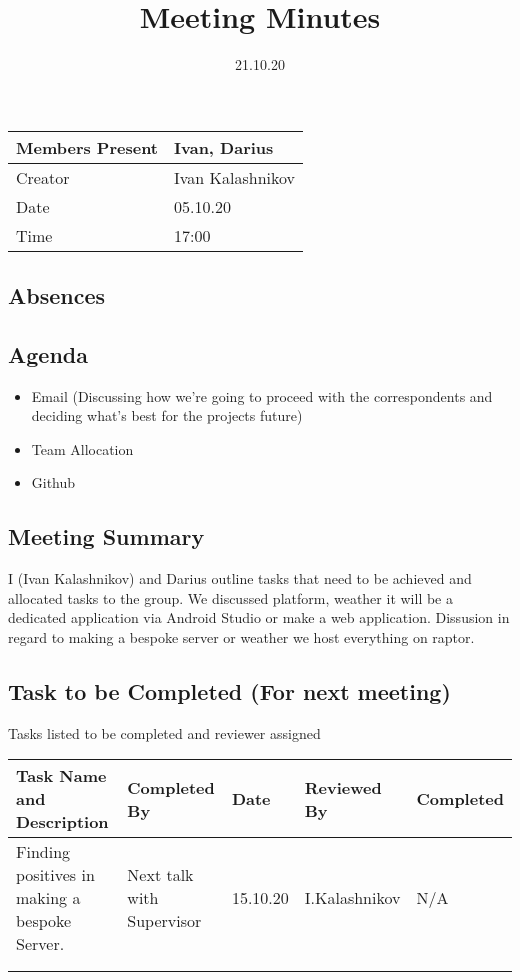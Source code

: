 \documentclass{article}
\title{Meeting Minutes}
\date{21.10.20}
\begin{document}
\maketitle

\begin{center}
    \begin{tabular}{ | l | p{14cm} |}
    \hline
    Members Present & Ivan, Darius \\ \hline
    Creator         & Ivan Kalashnikov \\ \hline
    Date            & 05.10.20 \\ \hline
    Time            & 17:00 \\ \hline
    \end{tabular}
\end{center}

\subsection{Absences}

\subsection{Agenda}
\begin{itemize}
    \item Email (Discussing how we're going to proceed with the correspondents and deciding what's best for the projects future)
    \item Team Allocation
    \item Github
\end{itemize}

\subsection{Meeting Summary}

I (Ivan Kalashnikov) and Darius outline tasks that need to be achieved and allocated tasks to the group.
We discussed platform, weather it will be a dedicated application via Android Studio or make a web application.
Dissusion in regard to making a bespoke server or weather we host everything on raptor.

\subsection{Task to be Completed (For next meeting) }
Tasks listed to be completed and reviewer assigned
\begin{center}
    \begin{tabular}{|p{9cm}|l|l|l|l|}
    \hline
    Task Name and Description & Completed By & Date & Reviewed By & Completed \\ \hline
    Finding positives in making a bespoke Server.  & Next talk with Supervisor &  15.10.20   & I.Kalashnikov & N/A\\ \hline
                              &              &      &             &           \\ \hline
                              &              &      &             &           \\ \hline
    \end{tabular}
    \end{center}
\end{document}
